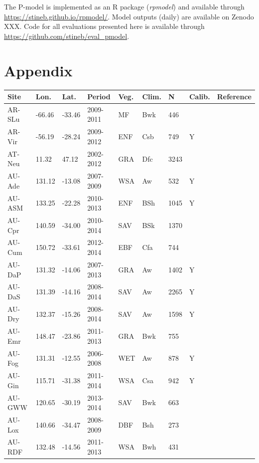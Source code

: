 \documentclass{myreport}
\begin{document}
The P-model is implemented as an R package (\textit{rpmodel}) and available through \url{https://stineb.github.io/rpmodel/}. Model outputs (daily) are available on Zenodo XXX. Code for all evaluations presented here is available through \url{https://github.com/stineb/eval_pmodel}. 

\section{Appendix}

\begin{longtable}{lllllllll}
  \toprule
Site & Lon. & Lat. & Period & Veg. & Clim. & N & Calib. & Reference \\ 
  \midrule
  AR-SLu & -66.46 & -33.46 & 2009-2011 & MF & Bwk & 446 &  & \citet{AR-SLu} \\ 
  AR-Vir & -56.19 & -28.24 & 2009-2012 & ENF & Csb & 749 & Y & \citet{AR-Vir} \\ 
  AT-Neu & 11.32 & 47.12 & 2002-2012 & GRA & Dfc & 3243 &  & \citet{AT-Neu} \\ 
  AU-Ade & 131.12 & -13.08 & 2007-2009 & WSA & Aw & 532 & Y & \citet{AU-Ade} \\ 
  AU-ASM & 133.25 & -22.28 & 2010-2013 & ENF & BSh & 1045 & Y & \citet{AU-ASM} \\ 
  AU-Cpr & 140.59 & -34.00 & 2010-2014 & SAV & BSk & 1370 &  & \citet{AU-Cpr} \\ 
  AU-Cum & 150.72 & -33.61 & 2012-2014 & EBF & Cfa & 744 &  & \citet{AU-Cum} \\ 
  AU-DaP & 131.32 & -14.06 & 2007-2013 & GRA & Aw & 1402 & Y & \citet{AU-DaP} \\ 
  AU-DaS & 131.39 & -14.16 & 2008-2014 & SAV & Aw & 2265 & Y & \citet{AU-DaS} \\ 
  AU-Dry & 132.37 & -15.26 & 2008-2014 & SAV & Aw & 1598 & Y & \citet{AU-Dry} \\ 
  AU-Emr & 148.47 & -23.86 & 2011-2013 & GRA & Bwk & 755 &  & \citet{AU-Emr} \\ 
  AU-Fog & 131.31 & -12.55 & 2006-2008 & WET & Aw & 878 & Y & \citet{AU-Fog} \\ 
  AU-Gin & 115.71 & -31.38 & 2011-2014 & WSA & Csa & 942 & Y & \citet{AU-Gin} \\ 
  AU-GWW & 120.65 & -30.19 & 2013-2014 & SAV & Bwk & 663 &  & \citet{AU-GWW} \\ 
  AU-Lox & 140.66 & -34.47 & 2008-2009 & DBF & Bsh & 273 &  & \citet{AU-Lox} \\ 
  AU-RDF & 132.48 & -14.56 & 2011-2013 & WSA & Bwh & 431 &  & \citet{AU-RDF} \\ 

\end{longtable}
\end{document}
